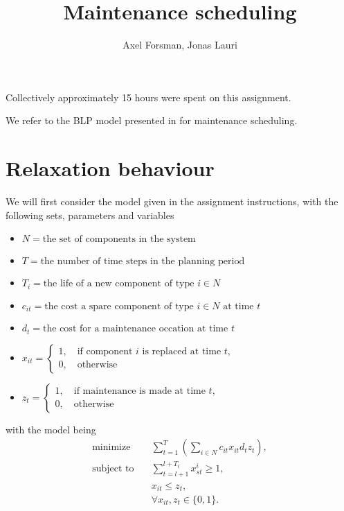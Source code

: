 \documentclass{article}
\title{Maintenance scheduling}
\author{Axel Forsman, Jonas Lauri}
\begin{document}
\maketitle
Collectively approximately 15 hours were spent on this assignment.

We refer to the BLP model presented in \autocite{almgren12}
for maintenance scheduling.

\section{Relaxation behaviour}
We will first consider the model given in the assignment instructions,
with the following sets, parameters and variables
\begin{itemize}
    \item $N = \text{the set of components in the system}$
    \item $T = \text{the number of time steps in the planning period}$
    \item $T_i = \text{the life of a new component of type } i \in N $
    \item $c_{it} = \text{the cost a spare component of type } i \in N \text{ at time } t$
    \item $d_t = \text{the cost for a maintenance occation at time } t$ 
    \item $x_{it} = \begin{cases} 1, \quad \text{if component } i \text{ is replaced at time } t, \\ 0, \quad \text{otherwise}
    \end{cases}$
\item $z_t = \begin{cases} 1, \quad \text{if maintenance is made at time } t, \\ 0, \quad \text{otherwise} \end{cases}$
\end{itemize}
with the model being
\begin{equation*}
	\begin{aligned}
        \text{minimize} \quad & \sum^T_{t=1} \left ( \sum_{i \in N} c_{it} x_{it} d_t z_t \right ), \\
        \text{subject to} \quad & \sum^{l+T_i}_{t=l+1} x^i_{st} \ge 1, \\
        & x_{it} \leq z_t, \\
        & \forall x_{it}, z_t \in \{0,1\}.
    \end{aligned}
\end{equation*}
\end{document}
